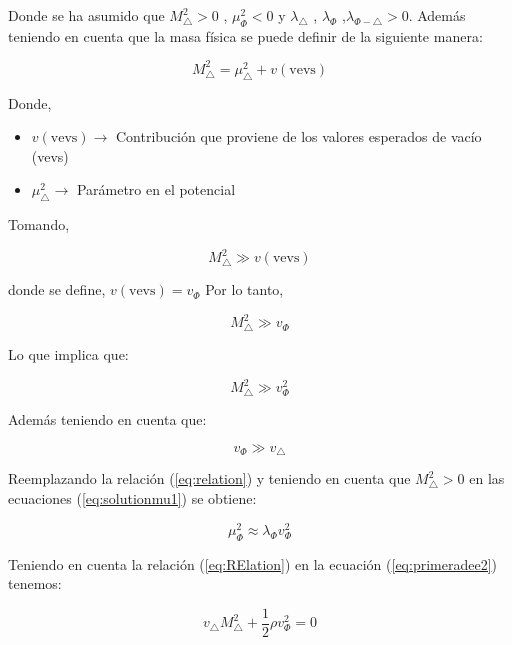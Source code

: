 \documentclass[12pt]{article}
\begin{document}
Donde se ha asumido que $M^{2}_\triangle>0$ , $\mu^{2}_\Phi<0$ y $\lambda_{\triangle }$ , $\lambda_{\Phi }$ ,$ \lambda_{\Phi- \triangle} >0 $. Además teniendo en cuenta que la masa física se puede definir de la siguiente manera:

\[M^{2}_\triangle =  \mu^{2}_\triangle + v(\text{vevs}) \]

Donde, 

\begin{itemize}
\item $v(\text{vevs}) \rightarrow $  Contribución que proviene de los valores esperados de vacío (vevs)

\item $ \mu^{2}_\triangle \rightarrow  $ Parámetro en el potencial
\end{itemize}

Tomando,

\[M^{2}_\triangle \gg v(\text{vevs}) \]



donde se define, $ v(\text{vevs}) = v_\Phi$
Por lo tanto, 

\begin{equation}
    \label{eq:relation2}
M^{2}_\triangle \gg v_\Phi\end{equation}

Lo que implica que: 


 \begin{equation}
     \label{eq:RElation}
     M^{2}_\triangle \gg v^{2}_\Phi
 \end{equation}

Además teniendo en cuenta que:

\begin{equation}
    \label{eq:relation}
    v_\Phi \gg v_\triangle
\end{equation}

Reemplazando la relación (\ref{eq:relation}) y teniendo en cuenta que $M^{2}_\triangle>0$ en las ecuaciones (\ref{eq:solutionmu1}) se obtiene: 

\begin{equation}
   \label{eq:M1}
   \mu^{2}_\Phi \approx  \lambda_{\Phi} v^{2}_\Phi 
\end{equation}

Teniendo en cuenta la relación (\ref{eq:RElation}) en la ecuación (\ref{eq:primeradee2})  tenemos:

\begin{equation}
\label{eq:pri2}
   v_\triangle M^{2}_\triangle   + \frac{1}{2}\rho v^{2}_\Phi = 0
\end{equation} \\
\end{document}
